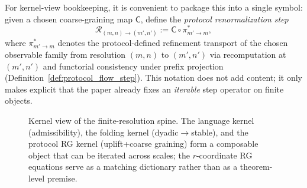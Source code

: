 For kernel-view bookkeeping, it is convenient to package this into a single symbol:
given a chosen coarse-graining map $\mathsf{C}$, define the \emph{protocol renormalization step}
\[
\mathcal{R}_{(m,n)\to(m',n')}:=\mathsf{C}\circ \pi_{m'\to m}^{\ast},
\]
where $\pi_{m'\to m}^{\ast}$ denotes the protocol-defined refinement transport of the chosen observable family from resolution $(m,n)$ to $(m',n')$ via recomputation at $(m',n')$ and functorial consistency under prefix projection (Definition~\ref{def:protocol_flow_step}).
This notation does not add content; it only makes explicit that the paper already fixes an \emph{iterable} step operator on finite objects.

\begin{figure}[t]
\centering
{}
\caption{Kernel view of the finite-resolution spine.
The language kernel (admissibility), the folding kernel (dyadic$\to$stable), and the protocol RG kernel (uplift+coarse graining) form a composable object that can be iterated across scales; the $r$-coordinate RG equations serve as a matching dictionary rather than as a theorem-level premise.}
\label{fig:kernel_view_flow}
\end{figure}

